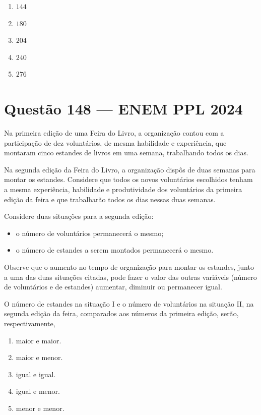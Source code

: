 \documentclass[11pt,a4paper]{article}
\begin{document}
\begin{enumerate}[label=(\Alph*)]
    \item $144$
    \item $180$
    \item $204$
    \item $240$
    \item $276$
\end{enumerate}

\section*{Questão 148 --- ENEM PPL 2024}

Na primeira edição de uma Feira do Livro, a organização contou com a participação de dez voluntários, de mesma habilidade e experiência, que montaram cinco estandes de livros em uma semana, trabalhando todos os dias.

Na segunda edição da Feira do Livro, a organização dispôs de duas semanas para montar os estandes. Considere que todos os novos voluntários escolhidos tenham a mesma experiência, habilidade e produtividade dos voluntários da primeira edição da feira e que trabalharão todos os dias nessas duas semanas.

Considere duas situações para a segunda edição:
\begin{itemize}
    \item[\textbf{I:}] o número de voluntários permanecerá o mesmo;
    \item[\textbf{II:}] o número de estandes a serem montados permanecerá o mesmo.
\end{itemize}

Observe que o aumento no tempo de organização para montar os estandes, junto a uma das duas situações citadas, pode fazer o valor das outras variáveis (número de voluntários e de estandes) aumentar, diminuir ou permanecer igual.

O número de estandes na situação I e o número de voluntários na situação II, na segunda edição da feira, comparados aos números da primeira edição, serão, respectivamente,

\begin{enumerate}[label=(\Alph*)]
    \item maior e maior.
    \item maior e menor.
    \item igual e igual.
    \item igual e menor.
    \item menor e menor.
\end{enumerate}
\end{document}

